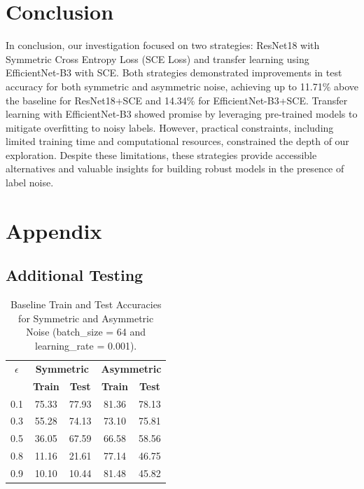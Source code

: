 \documentclass[11pt,twocolumn,letterpaper]{article}
\begin{document}
\section{Conclusion}

In conclusion, our investigation focused on two strategies: ResNet18 with Symmetric Cross Entropy Loss (SCE Loss) and transfer learning using EfficientNet-B3 with SCE. Both strategies demonstrated improvements in test accuracy for both symmetric and asymmetric noise, achieving up to 11.71\% above the baseline for ResNet18+SCE and 14.34\% for EfficientNet-B3+SCE. Transfer learning with EfficientNet-B3 showed promise by leveraging pre-trained models to mitigate overfitting to noisy labels. However, practical constraints, including limited training time and computational resources, constrained the depth of our exploration. Despite these limitations, these strategies provide accessible alternatives and valuable insights for building robust models in the presence of label noise.



{\small
%


}

\appendix
\section{Appendix}
\subsection{Additional Testing}
\begin{table}[H]
\centering
\begin{tabular}{|c|c|c|c|c|}
\hline
\textbf{\(\epsilon\)} & \multicolumn{2}{c|}{\textbf{Symmetric}} & \multicolumn{2}{c|}{\textbf{Asymmetric}} \\
\cline{2-5}
 & \textbf{Train} & \textbf{Test} & \textbf{Train} & \textbf{Test} \\
\hline
0.1 & 75.33 & 77.93 & 81.36 & 78.13 \\
\hline
0.3 & 55.28 & 74.13 & 73.10 & 75.81 \\
\hline
0.5 & 36.05 & 67.59 & 66.58 & 58.56 \\
\hline
0.8 & 11.16 & 21.61 & 77.14 & 46.75 \\
\hline
0.9 & 10.10 & 10.44 & 81.48 & 45.82 \\
\hline
\end{tabular}
\caption{Baseline Train and Test Accuracies for Symmetric and Asymmetric Noise (batch\_size = 64 and learning\_rate = 0.001).}
\label{tab:mergedAccuracyAdditional}
\end{table}
\end{document}
